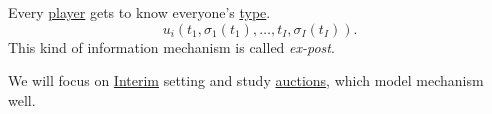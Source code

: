 \begin{definition}[Ex-post]\label{def:ex-post}
	Every \hyperref[def:player]{player} gets to know everyone's \hyperref[def:type]{type}.
	\[
		u_{i}(t_1, \sigma_1(t_1), \ldots , t_{I}, \sigma_{I}(t_{I})).
	\]
	This kind of information mechanism is called \emph{ex-post}.
\end{definition}

We will focus on \hyperref[def:interim]{Interim} setting and study \hyperref[ch:auctions]{auctions}, which model mechanism  well.